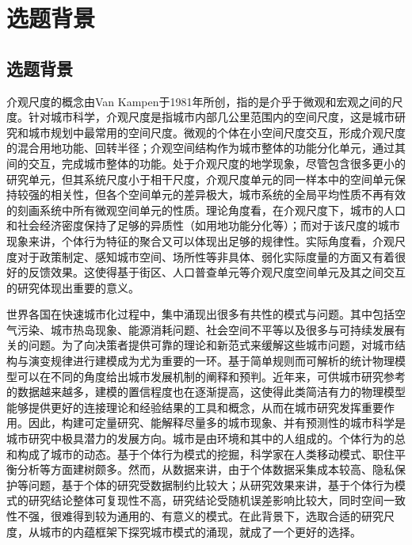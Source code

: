 \chapter{选题背景}
\setcounter{page}{1}


\section{选题背景} %


介观尺度的概念由Van Kampen于1981年所创，指的是介乎于微观和宏观之间的尺度。针对城市科学，介观尺度是指城市内部几公里范围内的空间尺度，这是城市研究和城市规划中最常用的空间尺度。微观的个体在小空间尺度交互，形成介观尺度的混合用地功能、回转半径；介观空间结构作为城市整体的功能分化单元，通过其间的交互，完成城市整体的功能。处于介观尺度的地学现象，尽管包含很多更小的研究单元，但其系统尺度小于相干尺度，介观尺度单元的同一样本中的空间单元保持较强的相关性，但各个空间单元的差异极大，城市系统的全局平均性质不再有效的刻画系统中所有微观空间单元的性质。理论角度看，在介观尺度下，城市的人口和社会经济密度保持了足够的异质性（如用地功能分化等）；而对于该尺度的城市现象来讲，个体行为特征的聚合又可以体现出足够的规律性。实际角度看，介观尺度对于政策制定、感知城市空间、场所性等非具体、弱化实际度量的方面又有着很好的反馈效果。这使得基于街区、人口普查单元等介观尺度空间单元及其之间交互的研究体现出重要的意义。

世界各国在快速城市化过程中，集中涌现出很多有共性的模式与问题。其中包括空气污染、城市热岛现象、能源消耗问题、社会空间不平等以及很多与可持续发展有关的问题。为了向决策者提供可靠的理论和新范式来缓解这些城市问题，对城市结构与演变规律进行建模成为尤为重要的一环。基于简单规则而可解析的统计物理模型可以在不同的角度给出城市发展机制的阐释和预判。近年来，可供城市研究参考的数据越来越多，建模的置信程度也在逐渐提高，这使得此类简洁有力的物理模型能够提供更好的连接理论和经验结果的工具和概念，从而在城市研究发挥重要作用。因此，构建可定量研究、能解释尽量多的城市现象、并有预测性的城市科学是城市研究中极具潜力的发展方向。城市是由环境和其中的人组成的。个体行为的总和构成了城市的动态。基于个体行为模式的挖掘，科学家在人类移动模式、职住平衡分析等方面建树颇多。然而，从数据来讲，由于个体数据采集成本较高、隐私保护等问题，基于个体的研究受数据制约比较大；从研究效果来讲，基于个体行为模式的研究结论整体可复现性不高，研究结论受随机误差影响比较大，同时空间一致性不强，很难得到较为通用的、有意义的模式。在此背景下，选取合适的研究尺度，从城市的内蕴框架下探究城市模式的涌现，就成了一个更好的选择。

